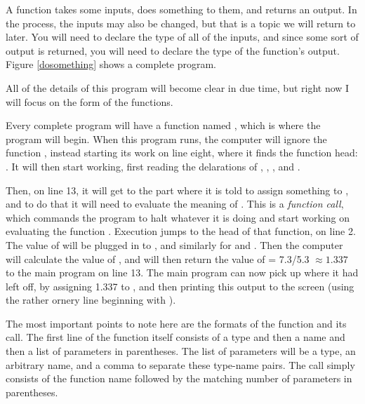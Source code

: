 \documentclass[12pt]{article}
\makeatletter
\def\ttind#1{\index{#1@\cinline{#1}}\cinline{#1}}
\makeatother
\begin{document}
A function takes some inputs, does something to them, and returns an
output. In the process, the inputs may also be changed, but that is a
topic we will return to later.  You will need to declare the type of all of
the inputs, and since some sort of output is returned, you will need to
declare the type of the function's output. Figure \ref{dosomething} shows a complete program.

\lstset{numbers=left, numberstyle=\scshape}
\lstset{numbers=none}

All of the details of this program will become clear in due time, but
right now I will focus on the form of the functions.

Every complete program will have a function named \ttind{main}, which
is where the program will begin.  When this program runs, the computer will
ignore the function , instead starting its work
on line eight, where it finds the  function head: . 
It will then start working, first reading the
delarations of , , , and .

Then, on line 13, it will get to the part where it is told to
assign something to , and to do that it will need
to evaluate  the meaning of . This is a {\em function call}, which commands the program
to halt whatever it is doing and start working on evaluating the
function . Execution jumps to the head of that
function, on line 2.  The value of 
will be plugged in to , and similarly for  and
. Then the computer will calculate the value of , and will then return the value of  =
7.3/5.3 $\approx 1.337$ to the main program on line 13. The main
program can now pick up where it had left off, by assigning 1.337 to
, and then printing this output to the screen (using
the rather ornery line beginning with ).

The most important points to note here are the formats of the function
and its call. The first line of the function itself consists of a type
and then a name and then a list of parameters in parentheses. 
The list of parameters will be a type, an arbitrary name, and a comma
to separate these type-name pairs.  The call simply consists of the
function name followed by the matching number of parameters in parentheses.
\end{document}
